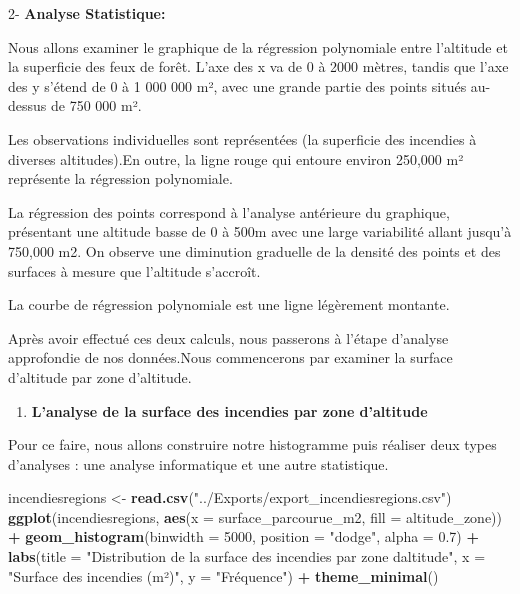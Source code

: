 \documentclass[
]{article}
\newenvironment{Shaded}{\begin{snugshade}}{\end{snugshade}}
\newcommand{\AttributeTok}[1]{\textcolor[rgb]{0.13,0.29,0.53}{#1}}
\newcommand{\DecValTok}[1]{\textcolor[rgb]{0.00,0.00,0.81}{#1}}
\newcommand{\FloatTok}[1]{\textcolor[rgb]{0.00,0.00,0.81}{#1}}
\newcommand{\FunctionTok}[1]{\textcolor[rgb]{0.13,0.29,0.53}{\textbf{#1}}}
\newcommand{\NormalTok}[1]{#1}
\newcommand{\OtherTok}[1]{\textcolor[rgb]{0.56,0.35,0.01}{#1}}
\newcommand{\SpecialCharTok}[1]{\textcolor[rgb]{0.81,0.36,0.00}{\textbf{#1}}}
\newcommand{\StringTok}[1]{\textcolor[rgb]{0.31,0.60,0.02}{#1}}
\providecommand{\tightlist}{%
  \setlength{\itemsep}{0pt}\setlength{\parskip}{0pt}}
\begin{document}
2- \textbf{Analyse Statistique:}

Nous allons examiner le graphique de la régression polynomiale entre
l'altitude et la superficie des feux de forêt. L'axe des x va de 0 à
2000 mètres, tandis que l'axe des y s'étend de 0 à 1 000 000 m², avec
une grande partie des points situés au-dessus de 750 000 m².

Les observations individuelles sont représentées (la superficie des
incendies à diverses altitudes).En outre, la ligne rouge qui entoure
environ 250,000 m² représente la régression polynomiale.

La régression des points correspond à l'analyse antérieure du graphique,
présentant une altitude basse de 0 à 500m avec une large variabilité
allant jusqu'à 750,000 m2. On observe une diminution graduelle de la
densité des points et des surfaces à mesure que l'altitude s'accroît.

La courbe de régression polynomiale est une ligne légèrement montante.

Après avoir effectué ces deux calculs, nous passerons à l'étape
d'analyse approfondie de nos données.Nous commencerons par examiner la
surface d'altitude par zone d'altitude.

\begin{enumerate}
\def\labelenumi{\arabic{enumi}.}
\tightlist
\item
  \textbf{L'analyse de la surface des incendies par zone d'altitude}
\end{enumerate}

Pour ce faire, nous allons construire notre histogramme puis réaliser
deux types d'analyses : une analyse informatique et une autre
statistique.

\begin{Shaded}
\begin{Highlighting}[]
\NormalTok{incendiesregions }\OtherTok{\textless{}{-}} \FunctionTok{read.csv}\NormalTok{(}\StringTok{"../Exports/export\_incendiesregions.csv"}\NormalTok{)}
\FunctionTok{ggplot}\NormalTok{(incendiesregions, }\FunctionTok{aes}\NormalTok{(}\AttributeTok{x =}\NormalTok{ surface\_parcourue\_m2, }\AttributeTok{fill =}\NormalTok{ altitude\_zone)) }\SpecialCharTok{+}
  \FunctionTok{geom\_histogram}\NormalTok{(}\AttributeTok{binwidth =} \DecValTok{5000}\NormalTok{, }\AttributeTok{position =} \StringTok{"dodge"}\NormalTok{, }\AttributeTok{alpha =} \FloatTok{0.7}\NormalTok{) }\SpecialCharTok{+}
  \FunctionTok{labs}\NormalTok{(}\AttributeTok{title =} \StringTok{"Distribution de la surface des incendies par zone d\textquotesingle{}altitude"}\NormalTok{,}
       \AttributeTok{x =} \StringTok{"Surface des incendies (m²)"}\NormalTok{, }\AttributeTok{y =} \StringTok{"Fréquence"}\NormalTok{) }\SpecialCharTok{+}
  \FunctionTok{theme\_minimal}\NormalTok{()}
\end{Highlighting}
\end{Shaded}
\end{document}
